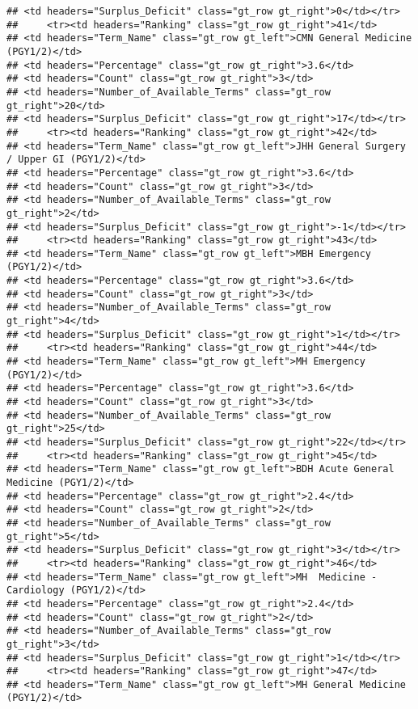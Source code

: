 \documentclass[
]{article}
\begin{document}
\begin{verbatim}
## <td headers="Surplus_Deficit" class="gt_row gt_right">0</td></tr>
##     <tr><td headers="Ranking" class="gt_row gt_right">41</td>
## <td headers="Term_Name" class="gt_row gt_left">CMN General Medicine (PGY1/2)</td>
## <td headers="Percentage" class="gt_row gt_right">3.6</td>
## <td headers="Count" class="gt_row gt_right">3</td>
## <td headers="Number_of_Available_Terms" class="gt_row gt_right">20</td>
## <td headers="Surplus_Deficit" class="gt_row gt_right">17</td></tr>
##     <tr><td headers="Ranking" class="gt_row gt_right">42</td>
## <td headers="Term_Name" class="gt_row gt_left">JHH General Surgery / Upper GI (PGY1/2)</td>
## <td headers="Percentage" class="gt_row gt_right">3.6</td>
## <td headers="Count" class="gt_row gt_right">3</td>
## <td headers="Number_of_Available_Terms" class="gt_row gt_right">2</td>
## <td headers="Surplus_Deficit" class="gt_row gt_right">-1</td></tr>
##     <tr><td headers="Ranking" class="gt_row gt_right">43</td>
## <td headers="Term_Name" class="gt_row gt_left">MBH Emergency (PGY1/2)</td>
## <td headers="Percentage" class="gt_row gt_right">3.6</td>
## <td headers="Count" class="gt_row gt_right">3</td>
## <td headers="Number_of_Available_Terms" class="gt_row gt_right">4</td>
## <td headers="Surplus_Deficit" class="gt_row gt_right">1</td></tr>
##     <tr><td headers="Ranking" class="gt_row gt_right">44</td>
## <td headers="Term_Name" class="gt_row gt_left">MH Emergency (PGY1/2)</td>
## <td headers="Percentage" class="gt_row gt_right">3.6</td>
## <td headers="Count" class="gt_row gt_right">3</td>
## <td headers="Number_of_Available_Terms" class="gt_row gt_right">25</td>
## <td headers="Surplus_Deficit" class="gt_row gt_right">22</td></tr>
##     <tr><td headers="Ranking" class="gt_row gt_right">45</td>
## <td headers="Term_Name" class="gt_row gt_left">BDH Acute General Medicine (PGY1/2)</td>
## <td headers="Percentage" class="gt_row gt_right">2.4</td>
## <td headers="Count" class="gt_row gt_right">2</td>
## <td headers="Number_of_Available_Terms" class="gt_row gt_right">5</td>
## <td headers="Surplus_Deficit" class="gt_row gt_right">3</td></tr>
##     <tr><td headers="Ranking" class="gt_row gt_right">46</td>
## <td headers="Term_Name" class="gt_row gt_left">MH  Medicine - Cardiology (PGY1/2)</td>
## <td headers="Percentage" class="gt_row gt_right">2.4</td>
## <td headers="Count" class="gt_row gt_right">2</td>
## <td headers="Number_of_Available_Terms" class="gt_row gt_right">3</td>
## <td headers="Surplus_Deficit" class="gt_row gt_right">1</td></tr>
##     <tr><td headers="Ranking" class="gt_row gt_right">47</td>
## <td headers="Term_Name" class="gt_row gt_left">MH General Medicine (PGY1/2)</td>

\end{verbatim}
\end{document}
